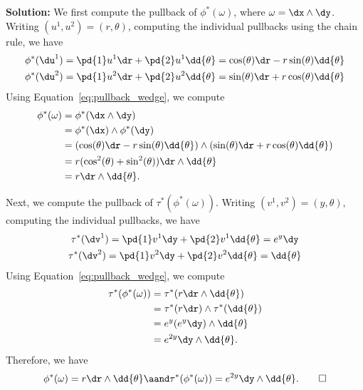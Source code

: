 \documentclass[notitlepage]{report}
\begin{document}
\begin{enumerate}
      \textbf{Solution:} We first compute the pullback of $\phi^*(\omega)$, where $\omega = \dx \wedge \dy$. Writing $(u^1, u^2) = (r, \theta)$, computing the individual pullbacks using the chain rule, we have
      \begin{gather*}
        \phi^*(\du^1) = \pd{1} u^1 \dr + \pd{2} u^1 \dd{\theta} = \cos(\theta) \dr - r \sin(\theta) \dd{\theta} \\
        \phi^*(\du^2) = \pd{1} u^2 \dr + \pd{2} u^2 \dd{\theta} = \sin(\theta) \dr + r \cos(\theta) \dd{\theta}
      \end{gather*}
      Using Equation~\eqref{eq:pullback_wedge}, we compute
      \begin{align*}
        \phi^*(\omega) &= \phi^*(\dx \wedge \dy) \\
                      &= \phi^*(\dx) \wedge \phi^*(\dy) \\
                      &= (\cos(\theta) \dr - r \sin(\theta) \dd{\theta}) \wedge (\sin(\theta) \dr + r \cos(\theta) \dd{\theta}) \\
                      &= r (\cos^2(\theta) + \sin^2(\theta)) \dr \wedge \dd{\theta} \\
                      &= r \dr \wedge \dd{\theta}
      .\end{align*}

      Next, we compute the pullback of $\tau^*(\phi^*(\omega))$. Writing $(v^1, v^2) = (y, \theta)$, computing the individual pullbacks, we have
      \begin{gather*}
        \tau^*(\dv^1) = \pd{1} v^1 \dy + \pd{2} v^1 \dd{\theta} = e^y \dy \\
        \tau^*(\dv^2) = \pd{1} v^2 \dy + \pd{2} v^2 \dd{\theta} = \dd{\theta}
      \end{gather*}
      Using Equation~\eqref{eq:pullback_wedge}, we compute
      \begin{align*}
        \tau^*(\phi^*(\omega)) &= \tau^*(r \dr \wedge \dd{\theta}) \\
                                &= \tau^*(r \dr) \wedge \tau^*(\dd{\theta}) \\
                                &= e^y (e^y \dy) \wedge \dd{\theta} \\
                                &= e^{2y} \dy \wedge \dd{\theta}
      .\end{align*}
      Therefore, we have
      \[%
        \phi^*(\omega) = r \dr \wedge \dd{\theta} \aand \tau^*(\phi^*(\omega)) = e^{2y} \dy \wedge \dd{\theta}
      .\tag*{$\square$}\]%


\end{enumerate}
\end{document}
